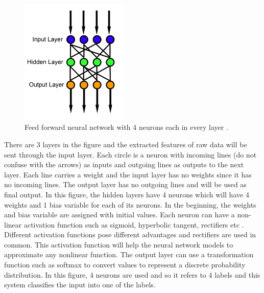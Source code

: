 \documentclass[a4paper, 11pt]{article}
\begin{document}
\begin{figure}[htpb]
    \centering
    \includegraphics[height=6cm,keepaspectratio=true]
    {Feed_forward_neural_net.png}
    \caption{
        Feed forward neural network with 4 neurons each in every layer \cite{WikipediaEN_FeedForward_Network}.
    }
    \label{fig:Feed forward neural network}
\end{figure}

There are 3 layers in the figure and the extracted features of raw data will be sent through the input layer. Each circle is a neuron with incoming lines (do not confuse with the arrows) as inputs and outgoing lines as outputs to the next layer. Each line carries a weight and the input layer has no weights since it has no incoming lines. The output layer has no outgoing lines and will be used as final output. In this figure, the hidden layers have 4 neurons which will have 4 weights and 1 bias variable for each of its neurons. In the beginning, the weights and bias variable are assigned with initial values. Each neuron can have a non-linear activation function such as sigmoid, hyperbolic tangent, rectifiers etc \cite{Goldberg2016}. Different activation functions pose different advantages and rectifiers are used in common. This activation function will help the neural network models to approximate any nonlinear function. The output layer can use a transformation function such as softmax to convert values to represent a discrete probability distribution. In this figure, 4 neurons are used and so it refers to 4 labels and this system classifies the input into one of the labels.
\end{document}
